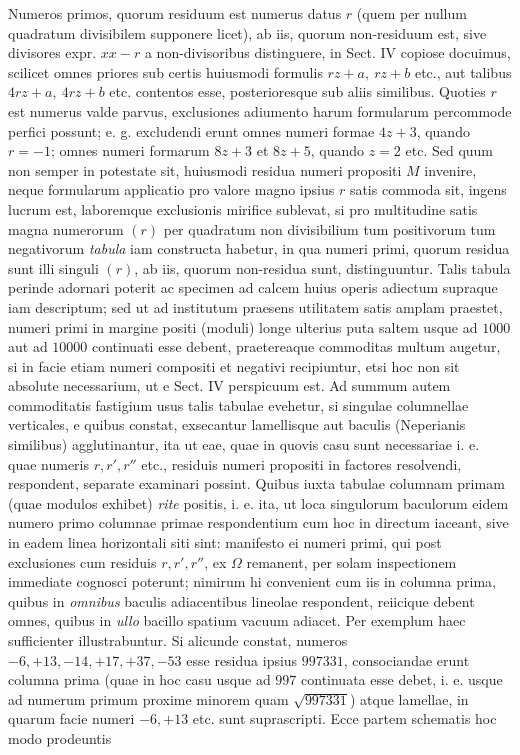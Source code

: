 Numeros primos, quorum residuum est numerus datus \(r\) (quem per nullum quadratum divisibilem supponere licet), ab iis, quorum non-residuum est, sive divisores expr. \(xx-r\) a non-divisoribus distinguere, in Sect. IV copiose docuimus, scilicet omnes priores sub certis huiusmodi formulis \(rz+a,\allowbreak \ rz+b\) etc., aut talibus \(4rz+a,\allowbreak \ 4rz+b\) etc. contentos esse, posterioresque sub aliis similibus. Quoties \(r\) est numerus valde parvus, exclusiones adiumento harum formularum
percommode perfici possunt; e. g. excludendi erunt omnes numeri formae \(4z+3\), quando \(r=-1\); omnes numeri formarum \(8z+3\) et \(8z+5\), quando \(z=2\) etc. Sed quum non semper in potestate sit, huiusmodi residua numeri propositi \(M\) invenire, neque formularum applicatio pro valore magno ipsius \(r\) satis commoda sit, ingens lucrum est, laboremque exclusionis mirifice sublevat, si pro multitudine satis magna numerorum \((r)\) per quadratum non divisibilium tum positivorum tum negativorum \textit{tabula} iam constructa habetur, in qua numeri primi, quorum residua sunt illi singuli \((r)\), ab iis, quorum non-residua sunt, distinguuntur. Talis tabula perinde adornari poterit ac specimen ad calcem huius operis adiectum supraque iam descriptum; sed ut ad institutum praesens utilitatem satis amplam praestet, numeri primi in margine positi (moduli) longe ulterius puta saltem usque ad \(1000\) aut ad \(10000\) continuati esse debent, praetereaque commoditas multum augetur, si in facie etiam numeri compositi et negativi recipiuntur, etsi hoc non sit absolute necessarium, ut e Sect. IV perspicuum est. Ad summum autem commoditatis fastigium usus talis tabulae evehetur, si singulae columnellae verticales, e quibus constat, exsecantur lamellisque aut baculis (Neperianis similibus) agglutinantur, ita ut eae, quae in quovis casu sunt necessariae i. e. quae numeris \(r,\allowbreak r',\allowbreak r''\) etc., residuis numeri propositi in factores resolvendi, respondent, separate examinari possint. Quibus iuxta tabulae columnam primam (quae modulos exhibet) \textit{rite} positis, i. e. ita, ut loca singulorum baculorum eidem numero primo columnae primae respondentium cum hoc in directum iaceant, sive in eadem linea horizontali siti sint: manifesto ei numeri primi, qui post exclusiones cum residuis \(r,\allowbreak r',\allowbreak r''\), ex \(\Omega\) remanent, per solam inspectionem immediate cognosci poterunt; nimirum hi convenient cum iis in columna prima, quibus in \textit{omnibus} baculis adiacentibus lineolae respondent, reiicique debent omnes, quibus in \textit{ullo} bacillo spatium vacuum adiacet. Per exemplum haec sufficienter illustrabuntur. Si alicunde constat, numeros \(-6,\allowbreak +13,\allowbreak -14,\allowbreak +17,\allowbreak +37,\allowbreak -53\) esse residua ipsius \(997331\), consociandae erunt columna prima (quae in hoc casu usque ad \(997\) continuata esse debet, i. e. usque ad numerum primum proxime minorem quam \(\surd{997331}\)) atque lamellae, in quarum facie numeri \(-6,\allowbreak +13\) etc. sunt suprascripti. Ecce partem schematis hoc modo prodeuntis
